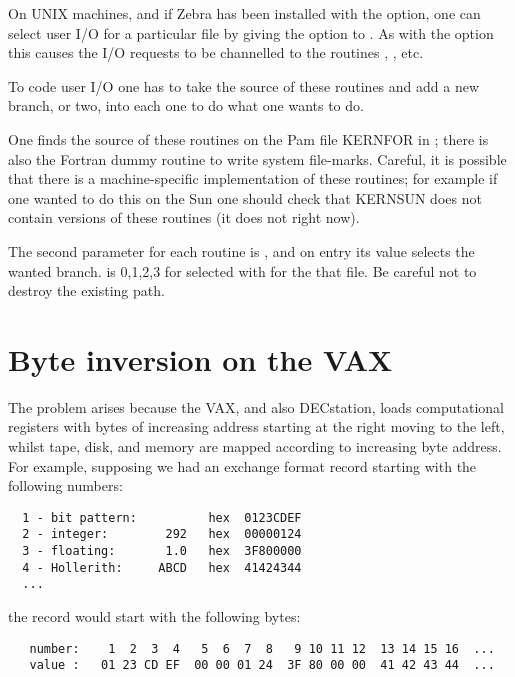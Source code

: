 On UNIX machines, and if Zebra has been installed with the
 option, one can select user I/O for a particular
file by giving the  option to .
As with the  option this causes the I/O requests to be
channelled to the routines , 
, etc.

To code user I/O one has to take the source of these
routines and add a new branch, or two, into each one
to do what one wants to do.

One finds the source of these routines on the Pam file
KERNFOR in ; there is also the Fortran dummy
routine  to write system file-marks.
Careful, it is possible that there is a machine-specific
implementation of these routines; for example if one
wanted to do this on the Sun one should check that
KERNSUN does not contain versions of these routines
(it does not right now).

The second parameter for each routine is ,
and on entry its value selects the wanted branch.
 is 0,1,2,3 for  selected 
with  for the that file.
Be careful not to destroy the existing path.

\section{Byte inversion on the VAX}

The problem arises because the VAX, and also DECstation,
loads computational registers with bytes of increasing address
starting at the right moving to the left, whilst tape, disk, and
memory are mapped according to increasing byte address.
For example, supposing we had an exchange format record
starting with the following numbers:

\begin{verbatim}
  1 - bit pattern:          hex  0123CDEF
  2 - integer:        292   hex  00000124
  3 - floating:       1.0   hex  3F800000
  4 - Hollerith:     ABCD   hex  41424344
  ...
\end{verbatim}

the record would start with the following bytes:

\begin{verbatim}
   number:    1  2  3  4   5  6  7  8   9 10 11 12  13 14 15 16  ...
   value :   01 23 CD EF  00 00 01 24  3F 80 00 00  41 42 43 44  ...
\end{verbatim}

